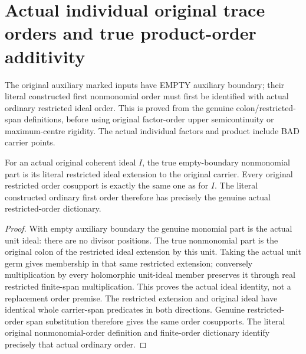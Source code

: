 \section{Actual individual original trace orders and true product-order additivity}

The original auxiliary marked inputs have EMPTY auxiliary boundary;
their literal constructed first nonmonomial order must first be
identified with actual ordinary restricted ideal order. This is proved
from the genuine colon/restricted-span definitions, before using
original factor-order upper semicontinuity or maximum-centre rigidity.
The actual individual factors and product include BAD carrier points.

\begin{lemma}
\label{hir:sharp-original-empty-boundary-ordinary-trace-order-dictionary}
\leanok
For an actual original coherent ideal $I$, the true empty-boundary
nonmonomial part is its literal restricted ideal extension to the
original carrier. Every original restricted order cosupport is exactly
the same one as for $I$. The literal constructed ordinary first order
therefore has precisely the genuine actual restricted-order dictionary.
\end{lemma}
\begin{proof}
With empty auxiliary boundary the genuine monomial part is the actual
unit ideal: there are no divisor positions. The true nonmonomial part
is the original colon of the restricted ideal extension by this unit.
Taking the actual unit germ gives membership in that same restricted
extension; conversely multiplication by every holomorphic unit-ideal
member preserves it through real restricted finite-span multiplication.
This proves the actual ideal identity, not a replacement order premise.
The restricted extension and original ideal have identical whole
carrier-span predicates in both directions. Genuine restricted-order
span substitution therefore gives the same order cosupports. The
literal original nonmonomial-order definition and finite-order
dictionary identify precisely that actual ordinary order.
\end{proof}

